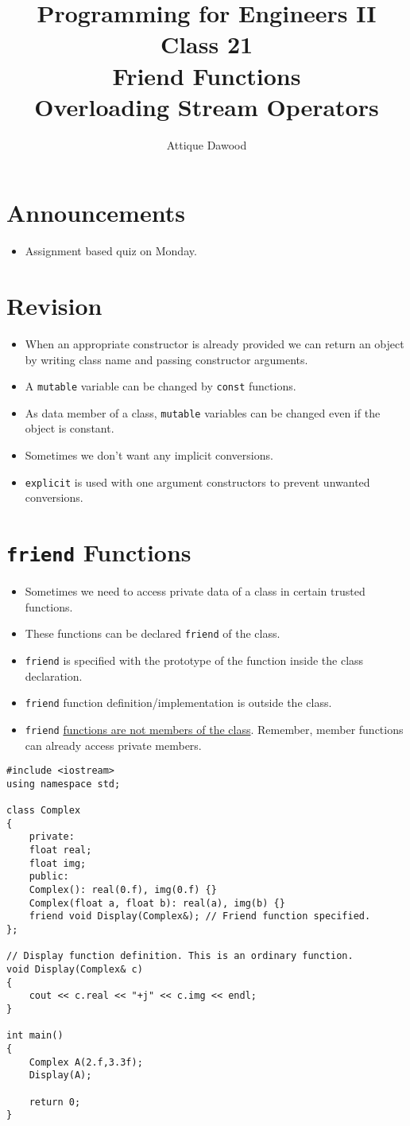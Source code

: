 \documentclass[12pt,a4paper]{article}
\title{\vspace{-2cm}Programming for Engineers II\\Class 21\\Friend Functions\\Overloading Stream Operators}
\author{Attique Dawood}
\begin{document}
\maketitle
\section{Announcements}
\begin{itemize}
\item Assignment based quiz on Monday.
\end{itemize}
\section{Revision}
\begin{itemize}
\item When an appropriate constructor is already provided we can return an object by writing class name and passing constructor arguments.
\item A \texttt{mutable} variable can be changed by \texttt{const} functions.
\item As data member of a class, \verb|mutable| variables can be changed even if the object is constant.
\item Sometimes we don't want any implicit conversions.
\item \verb|explicit| is used with one argument constructors to prevent unwanted conversions.
\end{itemize}
\section{\texttt{friend} Functions}
\begin{itemize}
\item Sometimes we need to access private data of a class in certain trusted functions.
\item These functions can be declared \verb|friend| of the class.
\item \verb|friend| is specified with the prototype of the function inside the class declaration.
\item \verb|friend| function definition/implementation is outside the class.
\item \verb|friend| \underline{functions are not members of the class}. Remember, member functions can already access private members.
\end{itemize}
\begin{lstlisting}[caption={\texttt{friend} function to display Complex number}]
#include <iostream>
using namespace std;

class Complex
{
	private:
	float real;
	float img;
	public:
	Complex(): real(0.f), img(0.f) {}
	Complex(float a, float b): real(a), img(b) {}
	friend void Display(Complex&); // Friend function specified.
};

// Display function definition. This is an ordinary function.
void Display(Complex& c)
{
	cout << c.real << "+j" << c.img << endl;
}

int main()
{
	Complex A(2.f,3.3f);
	Display(A);

	return 0;
}
\end{lstlisting}
\end{document}

